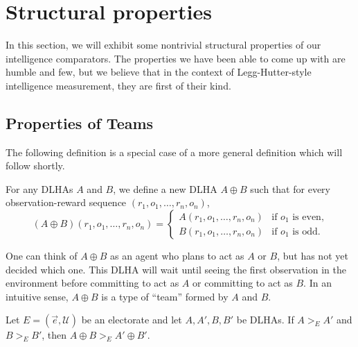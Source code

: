 \documentclass[twoside,11pt]{article}
\begin{document}
\section{Structural properties}
\label{structuralpropertiessection}

In this section, we will exhibit some nontrivial structural properties of
our intelligence comparators.
The properties we have been able to come up with are humble and few,
but we believe that in the context of Legg-Hutter-style intelligence measurement, they are
first of their kind.

\subsection{Properties of Teams}

The following definition is a special case of a more general definition which will
follow shortly.

\begin{definition}
\label{flexiblespecialcase}
For any DLHAs $A$ and $B$, we define a new
DLHA $A\oplus B$ such that for every observation-reward sequence
$(r_1,o_1,\ldots,r_n,o_n)$,
\[
(A\oplus B)(r_1,o_1,\ldots,r_n,o_n) =
    \begin{cases}
        A(r_1,o_1,\ldots,r_n,o_n) & \mbox{if $o_1$ is even,}\\
        B(r_1,o_1,\ldots,r_n,o_n) & \mbox{if $o_1$ is odd.}
    \end{cases}
\]
\end{definition}

One can think of $A\oplus B$ as an agent who plans to act as $A$ or $B$,
but has not yet decided which one. This DLHA will wait until seeing the first
observation in the environment before committing to act as $A$ or committing
to act as $B$. In an intuitive sense, $A\oplus B$ is a type of ``team'' formed
by $A$ and $B$.

\begin{proposition}
\label{EvenOddComboProposition}
Let $E=(\vec{e},\mathscr U)$ be an electorate
and let $A,A',B,B'$ be DLHAs.
If $A>_{E}A'$ and $B>_{E}B'$,
then $A\oplus B >_{E} A'\oplus B'$.
\end{proposition}
\end{document}
